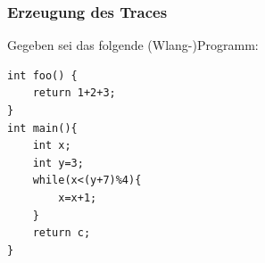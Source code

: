 \documentclass[parskip=full]{scrartcl}
\begin{document}
\begin{landscape}
\subsubsection{Erzeugung des Traces}
\begin{center}
\label{TraceGen}
\end{center}
\end{landscape}
\newpage
Gegeben sei das folgende (Wlang-)Programm:
\begin{verbatim}
int foo() {
    return 1+2+3;
}
int main(){
    int x;
    int y=3;
    while(x<(y+7)%4){
        x=x+1;
    }
    return c;
}
\end{verbatim}
\end{document}
